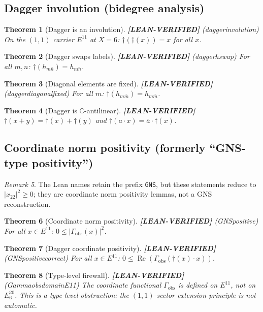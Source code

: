 \documentclass[11pt]{article}
\newtheorem{theorem}{Theorem}[section]
\theoremstyle{remark}
\newtheorem{remark}[theorem]{Remark}
\newcommand{\LEANVERIFIED}{\textbf{\color{green!60!black}[LEAN-VERIFIED]}}
\DeclareRobustCommand{\_}{\ifmmode\text{\textunderscore}\else\textunderscore\allowbreak\fi}
\begin{document}
\subsection{Dagger involution (bidegree analysis)}

\begin{theorem}[Dagger is an involution] \LEANVERIFIED{} \textnormal{(dagger\_involution)}
On the $(1,1)$ carrier $E^{11}$ at $X=6$: $\dagger(\dagger(x)) = x$ for all $x$.
\end{theorem}

\begin{theorem}[Dagger swaps labels] \LEANVERIFIED{} \textnormal{(dagger\_h\_swap)}
For all $m, n$: $\dagger(h_{m\bar{n}}) = h_{n\bar{m}}$.
\end{theorem}

\begin{theorem}[Diagonal elements are fixed] \LEANVERIFIED{} \textnormal{(dagger\_diagonal\_fixed)}
For all $m$: $\dagger(h_{m\bar{m}}) = h_{m\bar{m}}$.
\end{theorem}

\begin{theorem}[Dagger is $\mathbb{C}$-antilinear] \LEANVERIFIED{}
$\dagger(x + y) = \dagger(x) + \dagger(y)$ and $\dagger(a \cdot x) = \bar{a} \cdot \dagger(x)$.
\end{theorem}

\subsection{Coordinate norm positivity (formerly ``GNS-type positivity'')}

\begin{remark} The Lean names retain the prefix \texttt{GNS}, but these statements reduce to $|x_{22}|^2 \geq 0$; they are coordinate norm positivity lemmas, not a GNS reconstruction. \end{remark}
\begin{theorem}[Coordinate norm positivity] \LEANVERIFIED{} \textnormal{(GNS\_positive)}
For all $x \in E^{11}$: $0 \leq |\Gamma_{\mathrm{obs}}(x)|^2$.
\end{theorem}

\begin{theorem}[Dagger coordinate positivity] \LEANVERIFIED{} \textnormal{(GNS\_positive\_correct)}
For all $x \in E^{11}$: $0 \leq \operatorname{Re}(\Gamma_{\mathrm{obs}}(\dagger(x) \cdot x))$.
\end{theorem}

\begin{theorem}[Type-level firewall] \LEANVERIFIED{} \textnormal{(Gamma\_obs\_domain\_E11)}
The coordinate functional $\Gamma_{\mathrm{obs}}$ is defined on $E^{11}$, not on $E^{20}_6$.
This is a type-level obstruction: the $(1,1)$-sector extension principle is not automatic.
\end{theorem}
\end{document}
